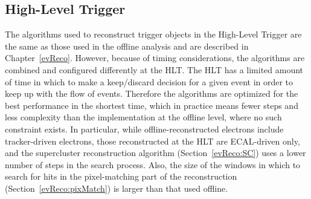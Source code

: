




\subsection{High-Level Trigger}
\label{evSel:HLT}


The algorithms used to reconstruct trigger objects 
in the High-Level Trigger are the same as those 
used in the offline analysis and are described in Chapter~\ref{evReco}.  
However, because of timing considerations, 
the algorithms are combined and configured differently at the HLT.  
The HLT has a limited amount of time in which to 
make a keep/discard decision for a given event 
in order to keep up with the flow of events.  
Therefore the algorithms are optimized for the best 
performance in the shortest time, 
which in practice means fewer steps and less 
complexity than the implementation at the offline level, 
where no such constraint exists.  
In particular, while offline-reconstructed electrons 
include tracker-driven electrons, 
those reconstructed at the HLT are ECAL-driven only, 
and the supercluster reconstruction algorithm 
(Section~\ref{evReco:SC}) uses 
a lower number of steps in the search process.  
Also, the size of the windows in which to search for 
hits in the pixel-matching part of the 
reconstruction (Section~\ref{evReco:pixMatch}) 
is larger than that used offline.  


